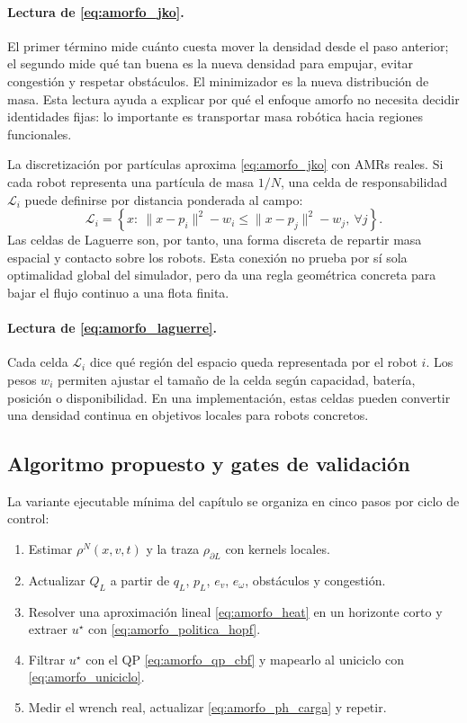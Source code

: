 \paragraph{Lectura de \eqref{eq:amorfo_jko}.}
El primer término mide cuánto cuesta mover la densidad desde el paso anterior; el segundo
mide qué tan buena es la nueva densidad para empujar, evitar congestión y respetar
obstáculos. El minimizador es la nueva distribución de masa. Esta lectura ayuda a
explicar por qué el enfoque amorfo no necesita decidir identidades fijas: lo importante
es transportar masa robótica hacia regiones funcionales.

La discretización por partículas aproxima \eqref{eq:amorfo_jko} con AMRs reales. Si cada
robot representa una partícula de masa $1/N$, una celda de responsabilidad
$\mathcal L_i$ puede definirse por distancia ponderada al campo:
\begin{equation}
  \mathcal L_i
  =
  \left\{
  x:\
  \|x-p_i\|^2-w_i
  \le
  \|x-p_j\|^2-w_j,\ \forall j
  \right\}.
  \label{eq:amorfo_laguerre}
\end{equation}
Las celdas de Laguerre son, por tanto, una forma discreta de repartir masa espacial y
contacto sobre los robots. Esta conexión no prueba por sí sola optimalidad global del
simulador, pero da una regla geométrica concreta para bajar el flujo continuo a una
flota finita.

\paragraph{Lectura de \eqref{eq:amorfo_laguerre}.}
Cada celda $\mathcal L_i$ dice qué región del espacio queda representada por el robot
$i$. Los pesos $w_i$ permiten ajustar el tamaño de la celda según capacidad, batería,
posición o disponibilidad. En una implementación, estas celdas pueden convertir una
densidad continua en objetivos locales para robots concretos.

\subsection{Algoritmo propuesto y gates de validación}
\label{subsec:amorfo-algoritmo}

La variante ejecutable mínima del capítulo se organiza en cinco pasos por ciclo de control:
\begin{enumerate}
  \item Estimar $\rho^N(x,v,t)$ y la traza $\rho_{\partial L}$ con kernels locales.
  \item Actualizar $Q_L$ a partir de $q_L$, $p_L$, $e_v$, $e_\omega$, obstáculos y
  congestión.
  \item Resolver una aproximación lineal \eqref{eq:amorfo_heat} en un horizonte corto y
  extraer $u^\star$ con \eqref{eq:amorfo_politica_hopf}.
  \item Filtrar $u^\star$ con el QP \eqref{eq:amorfo_qp_cbf} y mapearlo al uniciclo con
  \eqref{eq:amorfo_uniciclo}.
  \item Medir el wrench real, actualizar \eqref{eq:amorfo_ph_carga} y repetir.
\end{enumerate}

